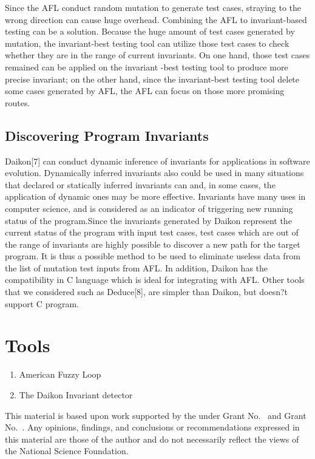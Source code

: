 \documentclass[sigplan,10pt,review]{acmart}\settopmatter{printfolios=true,printccs=false,printacmref=false}
\begin{document}
Since the AFL conduct random mutation to generate test cases, straying to the wrong direction can cause huge overhead. Combining the AFL to invariant-based testing can be a solution. Because the huge amount of test cases generated by mutation, the invariant-best testing tool can utilize those test cases to check whether they are in the range of current invariants. On one hand, those test cases remained can be applied on the invariant -best testing tool to produce more precise invariant; on the other hand, since the invariant-best testing tool delete some cases generated by AFL, the AFL can focus on those more promising routes.

\subsection{Discovering Program Invariants} 
Daikon[7] can conduct dynamic inference of invariants for applications in software evolution. Dynamically inferred invariants also could be used in many situations that declared or statically inferred invariants can and, in some cases, the application of dynamic ones may be more effective. Invariants have many uses in computer science, and is considered as an indicator of triggering new running status of the program.Since the invariants generated by Daikon represent the current status of the program with input test cases, test cases which are out of the range of invariants are highly possible to discover a new path for the target program. It is thus a possible method to be used to eliminate useless data from the list of mutation test inputs from AFL. In addition, Daikon has the compatibility in C language which is ideal for integrating with AFL. Other tools that we considered such as Deduce[8], are simpler than Daikon, but doesn?t support C program.

\section{Tools}

\begin{enumerate}
\item American Fuzzy Loop
\item The Daikon Invariant detector
\end{enumerate}


\begin{acks}                            %
  This material is based upon work supported by the
   under Grant
  No.~ and Grant
  No.~.  Any opinions, findings, and
  conclusions or recommendations expressed in this material are those
  of the author and do not necessarily reflect the views of the
  National Science Foundation.
\end{acks}
\end{document}
